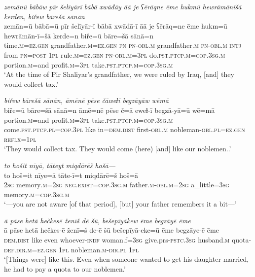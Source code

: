 \ea \label{BP.11}
\textit{zemānū bābāw pīr šelīyārī bābā xwāđāy āā je ʕērāqne ēme hukmū hewrāmānīšā kerden, biřew bārešā sānān} \\ 
\gll zemān=ū bābā=ū pīr šelīyār-ī bābā xwāđā-ī āā je ʕērāq=ne ēme hukm=ū hewrāmān-ī=šā kerde=n biře=ū bāre=šā sānā=n \\ 
 time\textsc{.m}\textsc{=ez.gen} grandfather\textsc{.m}\textsc{=ez.gen} \textsc{pn} \textsc{pn}\textsc{-obl}\textsc{.m} grandfather\textsc{.m} \textsc{pn}\textsc{-obl}\textsc{.m} \textsc{intj} from \textsc{pn}\textsc{=\textsc{post}} \textsc{1pl} rule\textsc{.m}\textsc{=ez.gen} \textsc{pn}\textsc{-obl}\textsc{.m}\textsc{=3pl} do\textsc{.pst}\textsc{.ptcp}\textsc{.m}\textsc{=cop}\textsc{.3sg}\textsc{.m} portion\textsc{.m}=and profit\textsc{.m}\textsc{=3pl} take\textsc{.pst}\textsc{.ptcp}\textsc{.m}\textsc{=cop}\textsc{.3sg}\textsc{.m} \\ 
\glt `At the time of Pir Shaliyar’s grandfather, we were ruled by Iraq, [and] they would collect tax.'
\z 
 
\ea \label{BP.12}
\textit{biřew bārešā sānān, āmēnē pēse čāweɫī begzāyāw wēmā} \\ 
\gll biře=ū bāre=šā sānā=n āmē=nē pēse č=ā eweɫ-ī begzā-yā=ū wē=mā \\ 
 portion\textsc{.m}=and profit\textsc{.m}\textsc{=3pl} take\textsc{.pst}\textsc{.ptcp}\textsc{.m}\textsc{=cop}\textsc{.3sg}\textsc{.m} come\textsc{.pst}\textsc{.ptcp}\textsc{.pl}\textsc{=cop}\textsc{.3pl} like in=\textsc{dem.dist} first\textsc{-obl}\textsc{.m} nobleman\textsc{-obl}\textsc{.pl}\textsc{=ez.gen} \textsc{reflx}\textsc{=\textsc{1pl}} \\ 
\glt `They would collect tax. They would come (here) [and] like our noblemen..'
\z 
 
\ea \label{BP.13}
\textit{to hošit nīyā, tāteyt miqdārēš hošā—} \\ 
\gll to hoš=it nīye=ā tāte-ī=t miqdārē=š hoš=ā \\ 
 \textsc{2sg} memory\textsc{.m}\textsc{=\textsc{2sg}} \textsc{\textsc{neg.}exist}\textsc{=cop}\textsc{.3sg}\textsc{.m} father\textsc{.m}\textsc{-obl}\textsc{.m}\textsc{=\textsc{2sg}} a\_little\textsc{=3sg} memory\textsc{.m}\textsc{=cop}\textsc{.3sg}\textsc{.m} \\ 
\glt `—you are not aware [of that period], [but] your father remembers it a bit—'
\z 
 
\ea \label{BP.17}
\textit{ā pāse hetā hečkesē ženīš dē šū, bešepīyākew ēme begzāyē ēme} \\ 
\gll ā pāse hetā hečkes-ē ženī=š de-ē šū bešepīyā-eke=ū ēme begzāye-ē ēme \\ 
 \textsc{dem.dist} like even whoever\textsc{-indf} woman.f\textsc{=3sg} give.prs\textsc{-pstc}\textsc{.3sg} husband\textsc{.m} quota\textsc{-def}\textsc{.dir}\textsc{.m}\textsc{=ez.gen} \textsc{1pl} nobleman\textsc{.m}\textsc{-dir}\textsc{.pl} \textsc{1pl} \\ 
\glt `[Things were] like this. Even when someone wanted to get his daughter married, he had to pay a quota  to our noblemen.'
\z 
 
